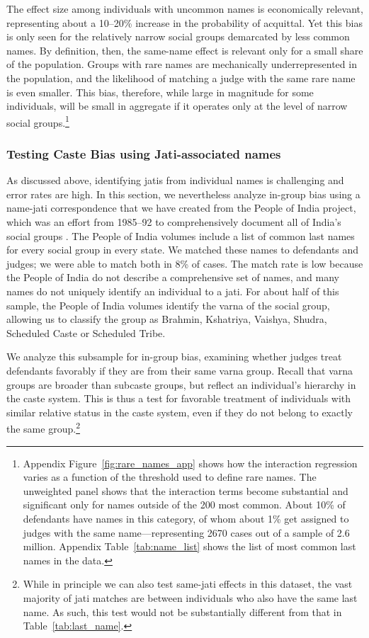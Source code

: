 \documentclass[12pt,english]{article}
\begin{document}
The effect size among individuals with uncommon names is economically relevant, representing about a 10--20\% increase in the probability of acquittal. Yet this bias is only seen for the relatively narrow social groups demarcated by less common names. By definition, then, the same-name effect is relevant only for a small share of the population. Groups with rare names are mechanically underrepresented in the population, and the likelihood of matching a judge with the same rare name is even smaller. This bias, therefore, while large in magnitude for some individuals, will be small in aggregate if it operates only at the level of narrow social groups.\footnote{Appendix Figure~\ref{fig:rare_names_app} shows how the interaction regression varies as a function of the threshold used to define rare names. The unweighted panel shows that the interaction terms become substantial and significant only for names outside of the 200 most common. About 10\% of defendants have names in this category, of whom about 1\% get assigned to judges with the same name---representing 2670 cases out of a sample of 2.6 million. Appendix Table~\ref{tab:name_list} shows the list of most common last names in the data.}

\subsubsection{Testing Caste Bias using Jati-associated names}

As discussed above, identifying jatis from individual names is challenging and error rates are high. In this section, we nevertheless analyze in-group bias using a name-jati correspondence that we have created from the People of India project, which was an effort from 1985--92 to comprehensively document all of India's social groups \citep{singh1992}. The People of India volumes include a list of common last names for every social group in every state. We matched these names to defendants and judges; we were able to match both in 8\% of cases. The match rate is low because the People of India do not describe a comprehensive set of names, and many names do not uniquely identify an individual to a jati. For about half of this sample, the People of India volumes identify the varna of the social group, allowing us to classify the group as Brahmin, Kshatriya, Vaishya, Shudra, Scheduled Caste or Scheduled Tribe.

We analyze this subsample for in-group bias, examining whether judges treat defendants favorably if they are from their same varna group. Recall that varna groups are broader than subcaste groups, but reflect an individual's hierarchy in the caste system. This is thus a test for favorable treatment of individuals with similar relative status in the caste system, even if they do not belong to exactly the same group.\footnote{While in principle we can also test same-jati effects in this dataset, the vast majority of jati matches are between individuals who also have the same last name. As such, this test would not be substantially different from that in Table~\ref{tab:last_name}.} 
\end{document}
